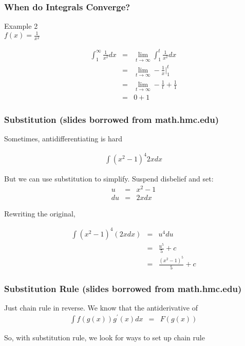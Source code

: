 \documentclass{beamer}
\numberwithin{equation}{section}
\begin{document}
\begin{frame}
\frametitle{When do Integrals Converge?}

Example 2 \\
$f(x) = \frac{1}{x^2} $ 

\begin{eqnarray}
\int_{1}^{\infty} \frac{1}{x^2} dx & = & \lim_{t \rightarrow \infty} \int_{1}^{t} \frac{1}{x^2} dx \nonumber \\
											& = & \lim_{t \rightarrow \infty} - \frac{1}{x} |_{1}^{t} \nonumber \\
											& = & \lim_{t \rightarrow \infty}  -\frac{1}{t} + \frac{1}{1} \nonumber \\
											& = & 0  + 1\nonumber
\end{eqnarray}											


\end{frame}


\begin{frame}
\frametitle{Substitution (slides borrowed from math.hmc.edu)}


Sometimes, antidifferentiating is \alert{hard}

\begin{eqnarray}
\int (x^2 -1)^4 2x  dx \nonumber 
\end{eqnarray}

But we can use substitution to simplify.  Suspend disbelief and set: 
\begin{eqnarray}
u & = & x^2 - 1\nonumber \\
du & = & 2x dx \nonumber 
\end{eqnarray}

Rewriting the original, 

\begin{eqnarray}
\int  (x^2 -1)^4 (2x  dx)  & = & u^4 du \nonumber \\
										&= & \frac{u^5}{5} + c \nonumber \\
										& = & \frac{(x^2 - 1)^5}{5} + c\nonumber 
\end{eqnarray}										


\end{frame}

\begin{frame}
\frametitle{Substitution Rule (slides borrowed from math.hmc.edu)}

Just chain rule in reverse.  We know that the antiderivative of 
\begin{eqnarray}
\int f(g(x))g^{'}(x) dx & = & F(g(x)) \nonumber 
\end{eqnarray}

So, with substitution rule, we look for ways to set up chain rule


\end{frame}
\end{document}

